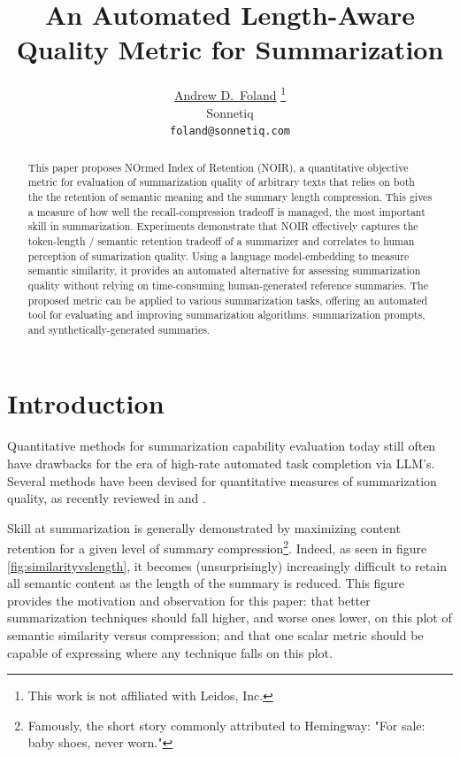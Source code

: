 \documentclass{article}
\title{An Automated Length-Aware Quality Metric for Summarization}
\author{ 
	\href{}{
		\hspace{1mm}
		Andrew D.~Foland}
	\thanks{This work is not affiliated with Leidos, Inc.
	}\\ 
    Sonnetiq\\
	\texttt{foland@sonnetiq.com} \\
}
\date{}
\begin{document}
\maketitle

\begin{abstract}
This paper proposes NOrmed Index of Retention (NOIR), a quantitative objective metric for evaluation of summarization quality of arbitrary texts that relies on both the the retention of semantic meaning and the summary length compression. 
This gives a measure of how well the recall-compression tradeoff is managed,
the most important skill in summarization.
Experiments demonstrate that NOIR effectively captures the token-length / semantic retention tradeoff of a summarizer and correlates to human perception of sumarization quality. 
Using a language model-embedding to measure semantic similarity, it provides an automated alternative for assessing summarization quality without relying on time-consuming human-generated reference summaries. 
The proposed metric can be applied to various summarization tasks, offering an automated tool for evaluating and improving summarization algorithms. summarization prompts, and synthetically-generated summaries.
\end{abstract}




\section{Introduction}
Quantitative methods for summarization capability evaluation today still often have drawbacks for the era of high-rate automated task completion via LLM's.
Several methods have been devised for quantitative measures of summarization quality, as recently reviewed in \citep{2023arXiv230504853R} and \citep{fabbri_summeval_2021}. 

Skill at summarization is generally demonstrated by maximizing content retention for a given level of summary compression\footnote{Famously, the short story commonly attributed to Hemingway: "For sale: baby shoes, never worn."}.  
Indeed, as seen in figure \ref{fig:similarityvslength}, it becomes (unsurprisingly) increasingly difficult to retain all semantic content as the length of the summary is reduced.
This figure provides the motivation and observation for this paper: that better summarization techniques should fall higher, and worse ones lower, on this plot of semantic similarity versus compression; and that one scalar metric should be capable of expressing where any technique falls on this plot.
\end{document}
